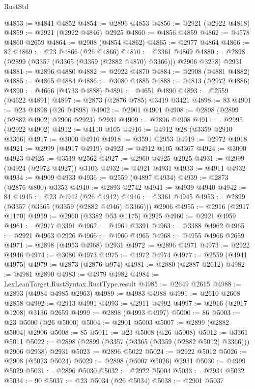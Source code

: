 \begin{lexlean}{RustStd}
\begin{coremodule}
@4853 := @4841 @4852
@4854 := @2896 @4853
@4856 := @2921 (@2922 @4818)
@4859 := @2921 (@2922 @4846) @2925
@4860 := @4856 @4859
@4862 := @4578 @4860 @2659
@4864 := @2908 (@4854 @4862)
@4865 := @2977 @4864
@4866 := 82
@4869 := @23 @4866 (@26 @4866)
@4870 := @3361 @4869
@4880 := @2898 (@2899 (@3357 (@3365 (@3359 (@2882 @4870) @3366))) @2906 @3278) @2931
@4881 := @2896 @4880
@4882 := @2922 @4870
@4884 := @2908 (@4881 @4882)
@4885 := @4865 @4884
@4886 := @3080 @4885
@4888 := @4813 (@2972 @4886)
@4890 := @4666 (@4733 @4888)
@4891 := @4651 @4890
@4893 := @2559 (@4622 @4891)
@4897 := @2873 (@2876 @785) @3419 @3421
@4898 := 83
@4901 := @23 @4898 (@26 @4898)
@4902 := @2901 @4901
@4908 := @2898 (@2899 (@2882 @4902) @2906 @2923) @2931
@4909 := @2896 @4908
@4911 := @2995 (@2922 @4902)
@4912 := @4110 @105
@4916 := @4912 @28 (@3359 @2910 @3366)
@4917 := @3000 @4916
@4918 := @3591 @2953
@4919 := @2972 @4918
@4921 := @2999 (@4917 @4919)
@4923 := @4912 @105 @3367
@4924 := @3000 @4923
@4925 := @3519 @2562
@4927 := @2960 @4925 @2925
@4931 := @2999 (@4924 (@2972 @4927)) @3103
@4932 := @4921 @4931
@4933 := @4911 @4932
@4934 := @4909 @4933
@4936 := @2559 (@4897 @4934)
@4939 := @2873 (@2876 @800) @3353
@4940 := @2893 @2742
@4941 := @4939 @4940
@4942 := 84
@4945 := @23 @4942 (@26 @4942)
@4946 := @3361 @4945
@4953 := @2899 (@3357 (@3365 (@3359 (@2882 @4946) @3366))) @2906
@4955 := @2916 (@2917 @1170)
@4959 := @2960 (@3382 @53 @1175) @2925
@4960 := @2921 @4959
@4961 := @2977 @3391
@4962 := @4961 @3391
@4963 := @3388 @4962
@4965 := @2921 @4963 @2926
@4966 := @4960 @4965
@4968 := @4955 @4966 @2659
@4971 := @2898 (@4953 @4968) @2931
@4972 := @2896 @4971
@4973 := @2922 @4946
@4974 := @3080 @4973
@4975 := @4972 @4974
@4977 := @2559 (@4941 @4975)
@4979 := @2873 (@2876 @974)
@4981 := @2880 (@2887 @2612)
@4982 := @4981 @2890
@4983 := @4979 @4982
@4984 := LexLeanTarget.RustSyntax.RustType.result
@4985 := @2649 @2615
@4988 := @2893 (@4984 @4985 @2963)
@4989 := @4983 @4988
@4991 := @2610 @2608 @2858
@4992 := @2913 @4991
@4993 := @2911 @4992
@4997 := @2916 (@2917 @1208) @3136 @2659
@4999 := @2898 (@4993 @4997)
@5000 := 86
@5003 := @23 @5000 (@26 @5000)
@5004 := @2901 @5003
@5007 := @2899 (@2882 @5004) @2906
@5008 := 85
@5011 := @23 @5008 (@26 @5008)
@5012 := @3361 @5011
@5022 := @2898 (@2899 (@3357 (@3365 (@3359 (@2882 @5012) @3366))) @2906 @2938) @2931
@5023 := @2896 @5022
@5024 := @2922 @5012
@5026 := @2908 (@5023 @5024)
@5029 := @2898 (@5007 @5026) @2931
@5030 := @4999 @5029
@5031 := @2896 @5030
@5032 := @2922 @5004
@5033 := @2934 @5032
@5034 := 90
@5037 := @23 @5034 (@26 @5034)
@5038 := @2901 @5037

\end{coremodule}
\end{lexlean}
